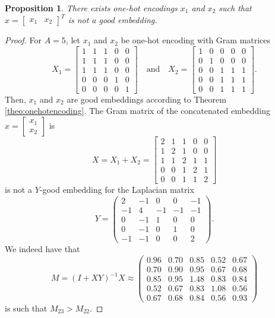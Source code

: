 \documentclass{article}
\newtheorem{proposition}{Proposition}
\begin{document}
\begin{proposition}
\label{prop:counterexampleb}
    There exists one-hot encodings $x_1$ and $x_2$ such that $x=\begin{bmatrix}
        x_1 &
        x_2
    \end{bmatrix}^T$ is not a good embedding.
\end{proposition}

\begin{proof}
For $A=5$, let $x_1$ and $x_2$ be one-hot encoding with Gram matrices
    \[
X_1 =
\begin{bmatrix}
1 & 1 & 1 & 0 & 0 \\
1 & 1 & 1 & 0 & 0 \\
1 & 1 & 1 & 0 & 0 \\
0 & 0 & 0 & 1 & 0 \\
0 & 0 & 0 & 0 & 1
\end{bmatrix} \quad \text{and} \quad
X_2 =
\begin{bmatrix}
1 & 0 & 0 & 0 & 0 \\
0 & 1 & 0 & 0 & 0 \\
0 & 0 & 1 & 1 & 1 \\
0 & 0 & 1 & 1 & 1 \\
0 & 0 & 1 & 1 & 1
\end{bmatrix}.
\]
Then, $x_1$ and $x_2$ are good embeddings according to  Theorem \ref{theo:onehotencoding}. The Gram matrix of the concatenated embedding $x = \begin{bmatrix}
    x_1 \\ x_2
\end{bmatrix}$ is
$$
X = X_1 + X_2 =
\begin{bmatrix}
2 & 1 & 1 & 0 & 0 \\
1 & 2 & 1 & 0 & 0 \\
1 & 1 & 2 & 1 & 1 \\
0 & 0 & 1 & 2 & 1 \\
0 & 0 & 1 & 1 & 2
\end{bmatrix} 
$$
is not a $Y$-good embedding for the Laplacian matrix
$$Y = \begin{pmatrix} 2 & -1 & 0 & 0 & -1 \\ -1 & 4 & -1 & -1 & -1 \\ 0 & -1 & 1 & 0 & 0 \\ 0 & -1 & 0 & 1 & 0 \\ -1 & -1 & 0 & 0 & 2 \end{pmatrix}.$$
We indeed have that
$$M = (I + XY)^{-1} X \approx \begin{pmatrix} 0.96 & 0.70 & 0.85 & 0.52 & 0.67 \\ 0.70 & 0.90 & 0.95 & 0.67 & 0.68 \\ 0.85 & 0.95 & 1.48 & 0.83 & 0.84 \\ 0.52 & 0.67 & 0.83 & 1.08 & 0.56 \\ 0.67 & 0.68 & 0.84 & 0.56 & 0.93 \end{pmatrix}$$
is such that $M_{23} > M_{22}$.
\end{proof}
\end{document}
